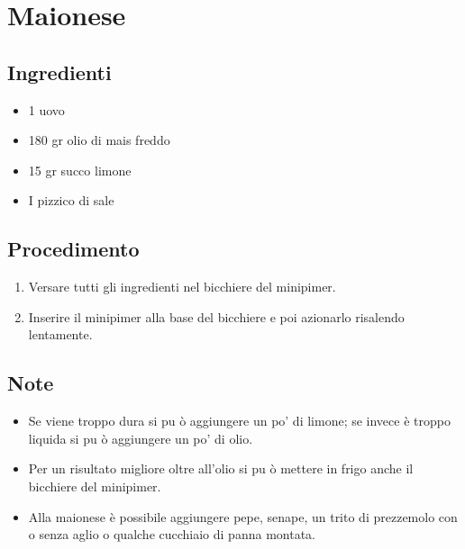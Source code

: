 \section{Maionese}
\subsection{Ingredienti}
\begin{itemize}
\item 1 uovo  
\item 180 gr olio di mais freddo  
\item 15 gr succo limone  
\item I pizzico di sale
\end{itemize}
\subsection{Procedimento}
\begin{enumerate}
\item  Versare tutti gli ingredienti nel bicchiere del minipimer.  
\item  Inserire il minipimer alla base del bicchiere e poi azionarlo risalendo lentamente.
\end{enumerate}
\subsection{Note}
\begin{itemize}
\item Se viene troppo dura si pu ò aggiungere un po' di limone; se invece è troppo liquida si pu ò aggiungere un po' di olio.  
\item Per un risultato migliore oltre all'olio si pu ò mettere in frigo anche il bicchiere del minipimer.  
\item Alla maionese è possibile aggiungere pepe, senape, un trito di prezzemolo con o senza aglio o qualche cucchiaio di panna montata.
\end{itemize}
